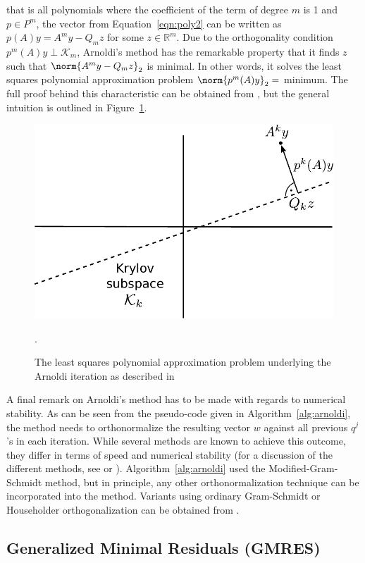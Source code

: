\noindent that is all polynomials where the coefficient of the term of degree $m$ is 1 and $p \in P^m$, the vector from Equation~\hyperref[eqn:poly2]{\ref{eqn:poly2}} can be written as $p(A)y=A^my-Q_mz$ for some $z \in \mathbb{R}^m$. Due to the orthogonality condition $p^m(A)y \perp \mathcal{K}_m$, Arnoldi's method has the remarkable property that it finds $z$ such that $\norm{A^my-Q_mz}_2$ is minimal. In other words, it solves the least squares polynomial approximation problem $\norm{p^m(A)y}_2 =$ minimum. The full proof behind this characteristic can be obtained from \cite{trefethen_numerical_1997}, but the general intuition is outlined in Figure~\hyperref[fig:arnoldi]{\ref{fig:arnoldi}}.

\begin{figure}[h]
    \centering
    \includegraphics[width=0.6\linewidth]{figures/Arnoldi.pdf}
    \caption{The least squares polynomial approximation problem underlying the Arnoldi iteration as described in \cite{trefethen_numerical_1997}}.
    \label{fig:arnoldi}
\end{figure}

\noindent A final remark on Arnoldi's method has to be made with regards to numerical stability. As can be seen from the pseudo-code given in Algorithm~\hyperref[alg:arnoldi]{\ref{alg:arnoldi}}, the method needs to orthonormalize the resulting vector $w$ against all previous $q^j$'s in each iteration. While several methods are known to achieve this outcome, they differ in terms of speed and numerical stability (for a discussion of the different methods, see \cite{golub_matrix_2013} or \cite{trefethen_numerical_1997}). Algorithm~\hyperref[alg:arnoldi]{\ref{alg:arnoldi}} used the Modified-Gram-Schmidt method, but in principle, any other orthonormalization technique can be incorporated into the method. Variants using ordinary Gram-Schmidt or Householder orthogonalization can be obtained from \cite{saad_iterative_2003}.



\subsection{Generalized Minimal Residuals (GMRES)}
\label{sec:gmres}

